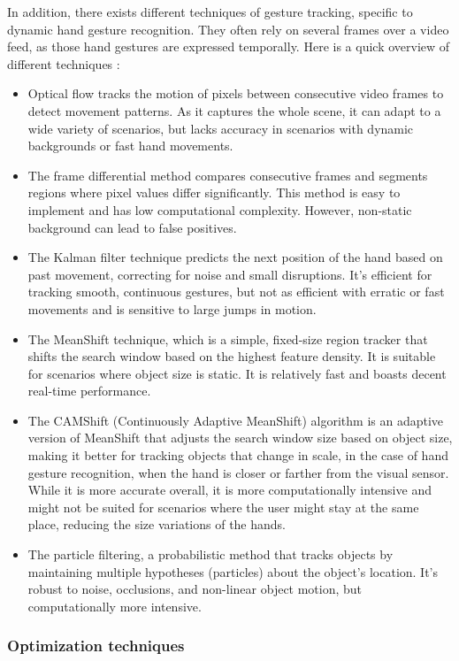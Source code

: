 \documentclass[12pt]{article}
\begin{document}
In addition, there exists different techniques of gesture tracking, specific to dynamic hand gesture recognition. They often rely on several frames over a video feed, as those hand gestures are expressed temporally. Here is a quick overview of different techniques :
\begin{itemize}
  \item Optical flow tracks the motion of pixels between consecutive video frames to detect movement patterns. As it captures the whole scene, it can adapt to a wide variety of scenarios, but lacks accuracy in scenarios with dynamic backgrounds or fast hand movements. 
  \item The frame differential method compares consecutive frames and segments regions where pixel values differ significantly. This method is easy to implement and has low computational complexity. However, non-static background can lead to false positives.
  \item The Kalman filter technique predicts the next position of the hand based on past movement, correcting for noise and small disruptions. It's efficient for tracking smooth, continuous gestures, but not as efficient with erratic or fast movements and is sensitive to large jumps in motion.
  \item The MeanShift technique, which is a simple, fixed-size region tracker that shifts the search window based on the highest feature density. It is suitable for scenarios where object size is static. It is relatively fast and boasts decent real-time performance.
  \item The CAMShift (Continuously Adaptive MeanShift) algorithm is an adaptive version of MeanShift that adjusts the search window size based on object size, making it better for tracking objects that change in scale, in the case of hand gesture recognition, when the hand is closer or farther from the visual sensor. While it is more accurate overall, it is more computationally intensive and might not be suited for scenarios where the user might stay at the same place, reducing the size variations of the hands.
  \item The particle filtering, a probabilistic method that tracks objects by maintaining multiple hypotheses (particles) about the object's location. It's robust to noise, occlusions, and non-linear object motion, but computationally more intensive.
\end{itemize}

\subsubsection{Optimization techniques}
\end{document}
